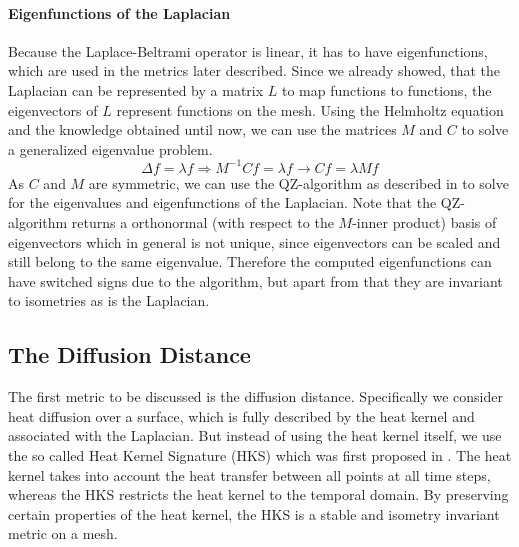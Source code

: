 \paragraph{Eigenfunctions of the Laplacian}
Because the Laplace-Beltrami operator is linear, it has to have eigenfunctions, which are used in the metrics later described.
Since we already showed, that the Laplacian can be represented by a matrix $L$ to map functions to functions, the eigenvectors of $L$ represent functions on the mesh.
Using the Helmholtz equation and the knowledge obtained until now, we can use the matrices $M$ and $C$ to solve a generalized eigenvalue problem.
\begin{equation}
	\Delta f = \lambda f \Rightarrow M^{-1}C f = \lambda f \rightarrow Cf = \lambda M f
	\label{eq:laplacian:eigenvalue}
\end{equation}
As $C$ and $M$ are symmetric, we can use the QZ-algorithm as described in \cite{moler1973algorithm} to solve for the eigenvalues and eigenfunctions of the Laplacian.
Note that the QZ-algorithm returns a orthonormal (with respect to the $M$-inner product) basis of eigenvectors which in general is not unique, since eigenvectors can be scaled and still belong to the same eigenvalue.
Therefore the computed eigenfunctions can have switched signs due to the algorithm, but apart from that they are invariant to isometries as is the Laplacian.

\subsection{The Diffusion Distance}
The first metric to be discussed is the diffusion distance.
Specifically we consider heat diffusion over a surface, which is fully described by the heat kernel and associated with the Laplacian.
But instead of using the heat kernel itself, we use the so called Heat Kernel Signature (HKS) which was first proposed in \cite{sun2009concise}.
The heat kernel takes into account the heat transfer between all points at all time steps, whereas the HKS restricts the heat kernel to the temporal domain.
By preserving certain properties of the heat kernel, the HKS is a stable and isometry invariant metric on a mesh.

